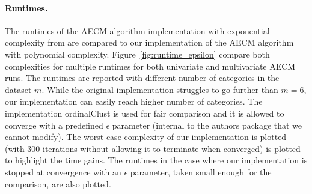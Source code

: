 \paragraph{Runtimes.}
\label{sec:runtime}
The runtimes of the AECM algorithm implementation with exponential complexity from \citet{biernacki2016model} 
are compared to our implementation of the AECM algorithm with polynomial complexity. Figure~\ref{fig:runtime_epsilon}  compare both complexities for multiple runtimes for both univariate and multivariate AECM runs. The runtimes are reported with different number of categories in the dataset $m$. While the original implementation struggles to go further than $m=6$, our implementation can easily reach higher number of categories. The implementation ordinalClust \cite{selosse2021ordinalclust} is used for fair comparison and it is allowed to converge with a predefined $\epsilon$ parameter (internal to the authors package that we cannot modify). 
The worst case complexity of our implementation is plotted (with $300$ iterations without allowing it to terminate when converged) is plotted to highlight the time gains. The runtimes in the case where our implementation is stopped at convergence with an $\epsilon$ parameter, taken small enough for the comparison, are also plotted.
